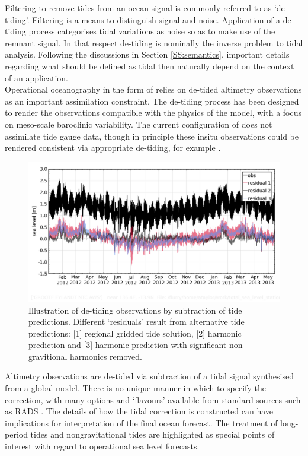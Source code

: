 Filtering to remove tides from an ocean signal is commonly referred to as `de-tiding'.  Filtering is a means to distinguish signal and noise.  Application of a de-tiding process categorises tidal variations as noise so as to make use of the remnant signal.   In that respect de-tiding is nominally the inverse problem to tidal analysis.   Following the discussions in Section \ref{SS:semantics}, important details regarding what should be defined as tidal then naturally depend on the context of an application.\\
Operational oceanography in the form of \BL{} relies on de-tided altimetry observations as an important assimilation constraint.   The de-tiding process has been designed to render the observations compatible with the physics of the model, with a focus on meso-scale baroclinic variability. The current configuration of \BL{} does not assimilate tide gauge data, though in principle these insitu observations could be rendered consistent via appropriate de-tiding, for example \cite{Matsumoto:2000tg}.\\


\begin{figure}[h]
\begin{center}
\includegraphics[width=\figwidthFull]{figures/plots/diag_plot_014406_detide_compare_20120101.png}
\caption{Illustration of de-tiding observations by subtraction of tide predictions.  Different `residuals' result from alternative tide predictions: [1] regional gridded tide solution, [2] harmonic prediction and [3] harmonic prediction with significant non-gravitional harmonics removed. }
\end{center}
\end{figure}


Altimetry observations are de-tided via subtraction of a tidal signal synthesised from a global model.  There is no unique manner in which to specify the correction, with many options and `flavours' available from standard sources such as RADS \citep[table 3.2]{Scharroo:2011vd}.  The details of how the tidal correction is constructed can have implications for interpretation of the final ocean forecast.   The treatment of long-period tides \citep{Egbert:2003jd} and nongravitational tides \citep{Arbic:2005gv} are highlighted as special points of interest with regard to operational sea level forecasts.\\




